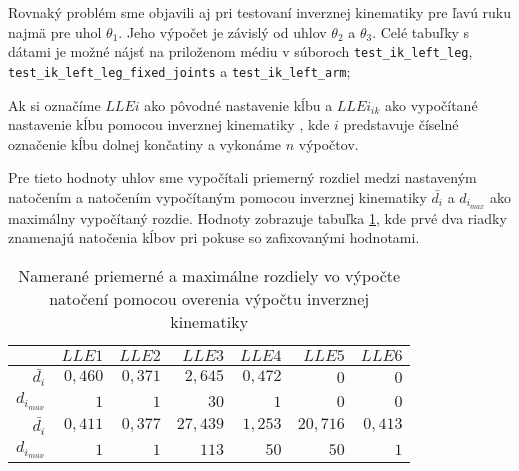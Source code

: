 Rovnaký problém sme objavili aj pri testovaní inverznej kinematiky pre ľavú ruku najmä pre uhol $\theta_1$. Jeho výpočet je závislý od uhlov $\theta_2$ a $\theta_3$. Celé tabuľky s dátami je možné nájsť na priloženom médiu v súboroch \texttt{test\_ik\_left\_leg}, \texttt{test\_ik\_left\_leg\_fixed\_joints} a \texttt{test\_ik\_left\_arm};

Ak si označíme $LLEi$ ako pôvodné nastavenie kĺbu a $LLEi_{ik}$ ako vypočítané nastavenie kĺbu pomocou inverznej kinematiky , kde $i$ predstavuje číselné označenie kĺbu dolnej končatiny a vykonáme $n$ výpočtov. 



Pre tieto hodnoty uhlov sme vypočítali priemerný rozdiel medzi nastaveným natočením a natočením vypočítaným pomocou inverznej kinematiky $\bar{d_i}$ a $d_{i_{max}}$ ako maximálny vypočítaný rozdie. Hodnoty zobrazuje tabuľka \ref{tab_ik_diffs}, kde prvé dva riadky znamenajú natočenia kĺbov pri pokuse so zafixovanými hodnotami.

\begin{table}[H]
	\centering
	\begin{tabular}{||r||r|r|r|r|r|r||}
		\hline
		\hline
		 & $LLE1$ & $LLE2$ & $LLE3$ & $LLE4$ & $LLE5$ & $LLE6$ \\
		 \hline
		 \hline
		 $\bar{d_i}$ & $0,460$ & $0,371$ & $2,645$ & $0,472$ & $0$ & $0$ \\
		 \hline
		 $d_{i_{max}}$ & $1$ & $1$ & $30$ & $1$ & $0$ & $0$ \\
		 \hline
		 \hline
		 $\bar{d_i}$ & $0,411$ & $0,377$ & $27,439$ & $1,253$ & $20,716$ & $0,413$ \\
		 \hline
		 $d_{i_{max}}$ & $1$ & $1$ & $113$ & $50$ & $50$ & $1$ \\
		 \hline
		 \hline
	\end{tabular}
	\caption{Namerané priemerné a maximálne rozdiely vo výpočte natočení pomocou overenia výpočtu inverznej kinematiky}
	\label{tab_ik_diffs}
\end{table}

